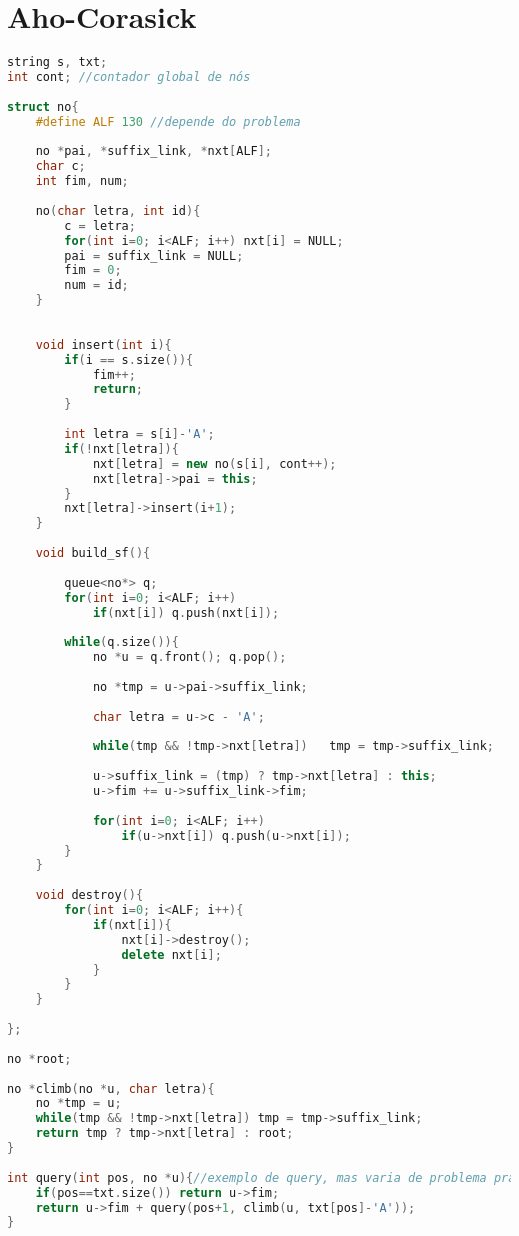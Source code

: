 \documentclass[12pt,a4paper,twoside]{report}
\begin{document}
\section{Aho-Corasick}
\noindent\begin{lstlisting}[caption=Aho-Corasick,language=C++]
string s, txt;
int cont; //contador global de nós
 
struct no{
    #define ALF 130 //depende do problema
     
    no *pai, *suffix_link, *nxt[ALF];
    char c;
    int fim, num;
     
    no(char letra, int id){
        c = letra;
        for(int i=0; i<ALF; i++) nxt[i] = NULL;
        pai = suffix_link = NULL;
        fim = 0;
        num = id;
    }
     
     
    void insert(int i){
        if(i == s.size()){
            fim++;
            return;
        }
         
        int letra = s[i]-'A';
        if(!nxt[letra]){
            nxt[letra] = new no(s[i], cont++);
            nxt[letra]->pai = this;
        }
        nxt[letra]->insert(i+1);
    }
     
    void build_sf(){
         
        queue<no*> q;
        for(int i=0; i<ALF; i++)
            if(nxt[i]) q.push(nxt[i]);
         
        while(q.size()){
            no *u = q.front(); q.pop();
             
            no *tmp = u->pai->suffix_link;
 
            char letra = u->c - 'A';
 
            while(tmp && !tmp->nxt[letra])   tmp = tmp->suffix_link;
 
            u->suffix_link = (tmp) ? tmp->nxt[letra] : this;
            u->fim += u->suffix_link->fim;
             
            for(int i=0; i<ALF; i++)
                if(u->nxt[i]) q.push(u->nxt[i]);
        }
    }
     
    void destroy(){
        for(int i=0; i<ALF; i++){
            if(nxt[i]){
                nxt[i]->destroy();
                delete nxt[i];
            }
        }
    }
     
};
 
no *root;
 
no *climb(no *u, char letra){
    no *tmp = u;
    while(tmp && !tmp->nxt[letra]) tmp = tmp->suffix_link;
    return tmp ? tmp->nxt[letra] : root;
}
 
int query(int pos, no *u){//exemplo de query, mas varia de problema pra problema
    if(pos==txt.size()) return u->fim;
    return u->fim + query(pos+1, climb(u, txt[pos]-'A'));
}
\end{lstlisting}
\end{document}
